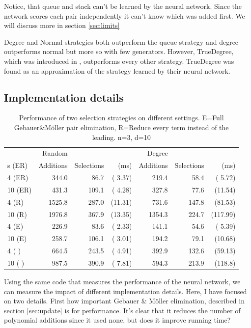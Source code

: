 \documentclass{article}
\theoremstyle{changedot}
\theoremstyle{changedotbreak}
\theoremstyle{nonumberplain}
\begin{document}
Notice, that queue and stack can't be learned by the neural network. Since the network scores each pair independently it can't know which was added first. We will discuss more in section \ref{sec:limits}

Degree and Normal strategies both outperform the queue strategy and degree outperforms normal but more so with few generators. However, TrueDegree, which was introduced in \cite{peifer}, outperforms every other strategy. TrueDegree was found as an approximation of the strategy learned by their neural network.

\subsection{Implementation details}
\begin{table}[h]
  \begin{tabular}{l|rrr|rrr}
                 & Random & &             & Degree & & \\
    s   (ER) & Additions & Selections & (ms) & Additions & Selections & (ms) \\ \hline
    4 \hfill  (ER) &  344.0& 86.7 & ( 3.37) &  219.4& 58.4 & ( 5.72) \\
    10 \hfill  (ER) &  431.3&109.1 & ( 4.28) &  327.8& 77.6 & (11.54) \\
    4 \hfill   (R) & 1525.8&287.0 & (11.31) &  731.6&147.8 & (81.53) \\
    10 \hfill  (R) & 1976.8&367.9 & (13.35) & 1354.3&224.7 & (117.99) \\
    4 \hfill   (E) &  226.9& 83.6 & ( 2.33) &  141.1& 54.6 & ( 5.39) \\
    10 \hfill  (E) &  258.7&106.1 & ( 3.01) &  194.2& 79.1 & (10.68) \\
    4 \hfill   (  ) &  664.5&243.5 & ( 4.91) &  392.9&132.6 & (59.13) \\
    10 \hfill  (  ) &  987.5&390.9 & ( 7.81) &  594.3&213.9 & (118.8)
  \end{tabular}
  \caption{Performance of two selection strategies on different settings. E=Full Gebauer\&Möller pair elimination, R=Reduce every term instead of the leading. n=3, d=10}
  \label{tab:imp_details}
\end{table}

Using the same code that measures the performance of the neural network, we can measure the impact of different implementation details. Here, I have focused on two details. First how important Gebauer \& Möller elimination, described in section \ref{sec:update} is for performance. It's clear that it reduces the number of polynomial additions since it used none, but does it improve running time?
\end{document}
